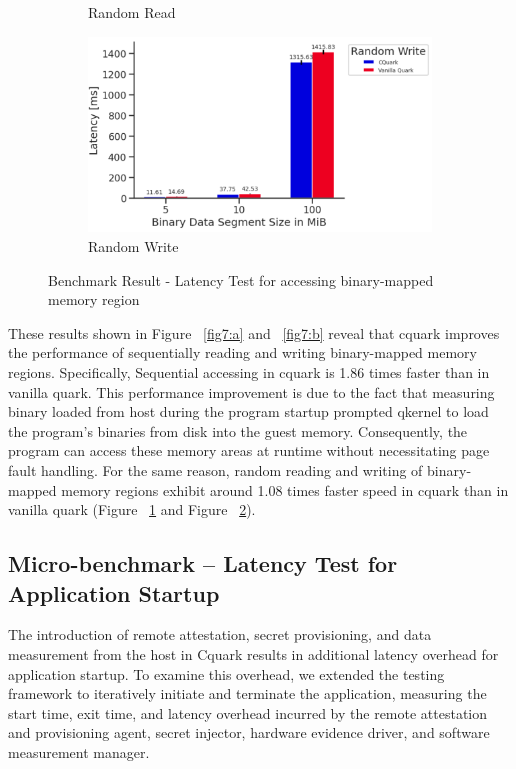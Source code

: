 \begin{figure}[ht]
\begin{subfigure}[b]{0.5\linewidth}
      \caption{Random Read} 
      \label{fig7:c} 
    \end{subfigure}%
    \begin{subfigure}[b]{0.5\linewidth}
      \centering
      \includegraphics[width=0.9\linewidth]{images/Random_Write.PNG} 
      \caption{Random Write} 
      \label{fig7:d} 
    \end{subfigure} 
    \caption{Benchmark Result - Latency Test for accessing binary-mapped memory region}
    \label{fig7} 
\end{figure}



These results shown in Figure ~\ref{fig7:a} and ~\ref{fig7:b} reveal that cquark improves the performance of sequentially reading and writing binary-mapped memory regions. Specifically, Sequential accessing in cquark is 1.86 times faster than in vanilla quark. This performance improvement is due to the fact that measuring binary loaded from 
host during the program startup prompted qkernel to load the program's binaries from disk into the guest memory. Consequently, the program can access these memory areas at runtime without necessitating page fault handling. For the same reason, random reading and writing of binary-mapped memory 
regions exhibit around 1.08 times faster speed in cquark than in vanilla quark (Figure ~\ref{fig7:c} and Figure ~\ref{fig7:d}).



\subsection{Micro-benchmark – Latency Test for Application Startup}
The introduction of remote attestation, secret provisioning, and data measurement from the host in Cquark results in additional latency overhead for application startup. To examine this overhead, we extended the testing framework to iteratively initiate and terminate the application, measuring the 
start time, exit time, and latency overhead incurred by the remote attestation and provisioning agent, secret injector, hardware evidence driver, and software measurement manager.

